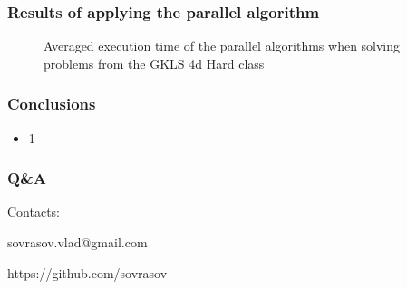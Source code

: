 \documentclass[aspectratio=1610]{beamer}
\newcommand\unnumbered{\setbeamertemplate{footline}{}}
\begin{document}
\begin{frame}
  \frametitle{Results of applying the parallel algorithm}
  \begin{figure}[ht]
    \centering
    \caption{Averaged execution time of the parallel algorithms when solving problems from the GKLS 4d Hard class}
  \end{figure}
\end{frame}


\begin{frame}
  \frametitle{Conclusions}
    \begin{itemize}
      \item 1
    \end{itemize}
\end{frame}
{
\unnumbered
\begin{frame}{{}}
  \frametitle{Q\&A}
  \begin{center}
    \Large{Contacts:}
\vspace{0.5cm}

    sovrasov.vlad@gmail.com

    https://github.com/sovrasov
  \end{center}
\end{frame}
}
\end{document}

